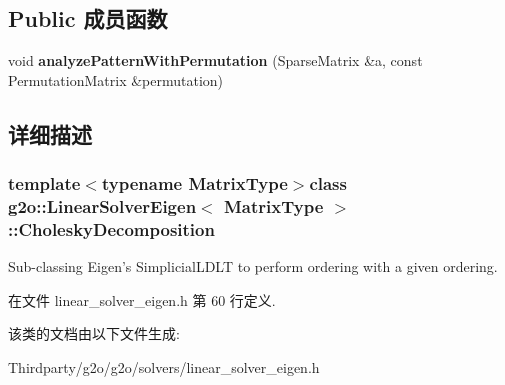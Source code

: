 \subsection*{Public 成员函数}
\begin{DoxyCompactItemize}
\item 
\hypertarget{classg2o_1_1LinearSolverEigen_1_1CholeskyDecomposition_a3aa432f9aec0b7230c733df9a4d80558}{void {\bfseries analyze\-Pattern\-With\-Permutation} (Sparse\-Matrix \&a, const Permutation\-Matrix \&permutation)}\label{classg2o_1_1LinearSolverEigen_1_1CholeskyDecomposition_a3aa432f9aec0b7230c733df9a4d80558}

\end{DoxyCompactItemize}


\subsection{详细描述}
\subsubsection*{template$<$typename Matrix\-Type$>$class g2o\-::\-Linear\-Solver\-Eigen$<$ Matrix\-Type $>$\-::\-Cholesky\-Decomposition}

Sub-\/classing Eigen's Simplicial\-L\-D\-L\-T to perform ordering with a given ordering. 

在文件 linear\-\_\-solver\-\_\-eigen.\-h 第 60 行定义.



该类的文档由以下文件生成\-:\begin{DoxyCompactItemize}
\item 
Thirdparty/g2o/g2o/solvers/linear\-\_\-solver\-\_\-eigen.\-h\end{DoxyCompactItemize}
